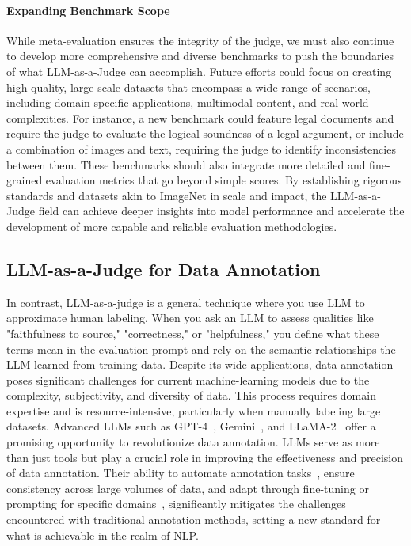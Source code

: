 \paragraph{\textbf{Expanding Benchmark Scope}}
While meta-evaluation ensures the integrity of the judge, we must also continue to develop more comprehensive and diverse benchmarks to push the boundaries of what LLM-as-a-Judge can accomplish. Future efforts could focus on creating high-quality, large-scale datasets that encompass a wide range of scenarios, including domain-specific applications, multimodal content, and real-world complexities. For instance, a new benchmark could feature legal documents and require the judge to evaluate the logical soundness of a legal argument, or include a combination of images and text, requiring the judge to identify inconsistencies between them. These benchmarks should also integrate more detailed and fine-grained evaluation metrics that go beyond simple scores. By establishing rigorous standards and datasets akin to ImageNet in scale and impact, the LLM-as-a-Judge field can achieve deeper insights into model performance and accelerate the development of more capable and reliable evaluation methodologies.


\subsection{LLM-as-a-Judge for Data Annotation}
{In contrast, LLM-as-a-judge is a general technique where you use LLM to approximate human labeling. When you ask an LLM to assess qualities like "faithfulness to source," "correctness," or "helpfulness," you define what these terms mean in the evaluation prompt and rely on the semantic relationships the LLM learned from training data. }
Despite its wide applications, data annotation poses significant challenges for current machine-learning models due to the complexity, subjectivity, and diversity of data. This process requires domain expertise and is resource-intensive, particularly when manually labeling large datasets. Advanced LLMs such as GPT-4~\cite{openai2023gpt4}, Gemini~\cite{team2023gemini}, and LLaMA-2~\cite{touvron2023llama2} offer a promising opportunity to revolutionize data annotation. LLMs serve as more than just tools but play a crucial role in improving the effectiveness and precision of data annotation. Their ability to automate annotation tasks~\citep{zhang2022automatic}, ensure consistency across large volumes of data, and adapt through fine-tuning or prompting for specific domains~\citep{song2023preference, ma2024leveraginglargelanguagemodels}, significantly mitigates the challenges encountered with traditional annotation methods, setting a new standard for what is achievable in the realm of NLP.


